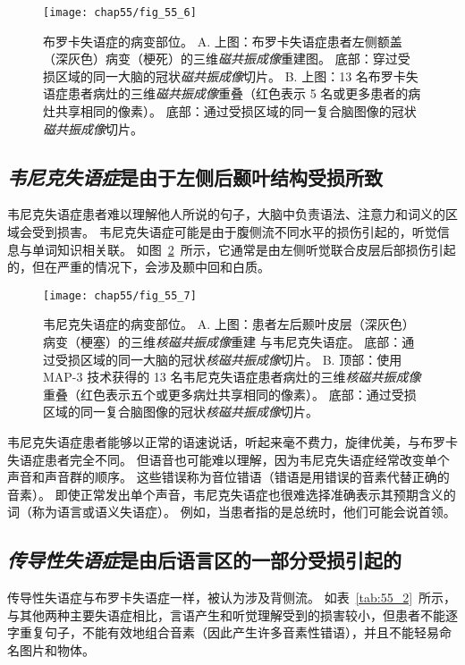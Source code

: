 \begin{figure}[htbp]
	\centering
	\texttt{[image: chap55/fig\_55\_6]}
	\caption{布罗卡失语症的病变部位。
		A. 上图：布罗卡失语症患者左侧额盖（深灰色）病变（梗死）的三维\textit{磁共振成像}重建图。
		底部：穿过受损区域的同一大脑的冠状\textit{磁共振成像}切片。
		B. 上图：13 名布罗卡失语症患者病灶的三维\textit{磁共振成像}重叠（红色表示 5 名或更多患者的病灶共享相同的像素）。
		底部：通过受损区域的同一复合脑图像的冠状\textit{磁共振成像}切片。}
	\label{fig:55_6}
\end{figure}



\subsection{\textit{韦尼克失语症}是由于左侧后颞叶结构受损所致}

韦尼克失语症患者难以理解他人所说的句子，大脑中负责语法、注意力和词义的区域会受到损害。
韦尼克失语症可能是由于腹侧流不同水平的损伤引起的，听觉信息与单词知识相关联。
如图~\ref{fig:55_7}~所示，它通常是由左侧听觉联合皮层后部损伤引起的，但在严重的情况下，会涉及颞中回和白质。


\begin{figure}[htbp]
	\centering
	\texttt{[image: chap55/fig\_55\_7]}
	\caption{韦尼克失语症的病变部位。
		A. 上图：患者左后颞叶皮层（深灰色）病变（梗塞）的三维\textit{核磁共振成像}重建 与韦尼克失语症。
		底部：通过受损区域的同一大脑的冠状\textit{核磁共振成像}切片。
		B. 顶部：使用 MAP-3 技术获得的 13 名韦尼克失语症患者病灶的三维\textit{核磁共振成像}重叠（红色表示五个或更多病灶共享相同的像素）。
		底部：通过受损区域的同一复合脑图像的冠状\textit{核磁共振成像}切片。}
	\label{fig:55_7}
\end{figure}


韦尼克失语症患者能够以正常的语速说话，听起来毫不费力，旋律优美，与布罗卡失语症患者完全不同。
但语音也可能难以理解，因为韦尼克失语症经常改变单个声音和声音群的顺序。
这些错误称为音位错语（错语是用错误的音素代替正确的音素）。
即使正常发出单个声音，韦尼克失语症也很难选择准确表示其预期含义的词（称为语言或语义失语症）。
例如，当患者指的是总统时，他们可能会说首领。


\subsection{\textit{传导性失语症}是由后语言区的一部分受损引起的}

传导性失语症与布罗卡失语症一样，被认为涉及背侧流。
如表~\ref{tab:55_2}~所示，与其他两种主要失语症相比，言语产生和听觉理解受到的损害较小，但患者不能逐字重复句子，不能有效地组合音素（因此产生许多音素性错语），并且不能轻易命名图片和物体。


